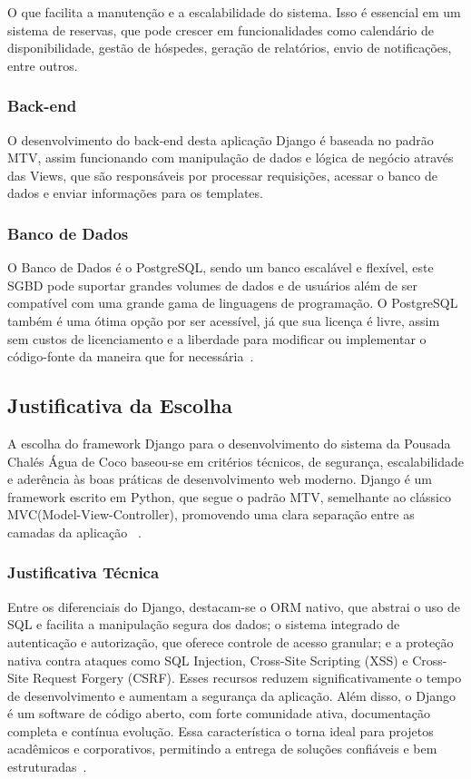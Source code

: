 \documentclass[
	12pt,				%
	openany,			%
	twoside,			%
	a4paper,			%
	english,			%
	french,				%
	spanish,			%
	brazil				%
	]{abntex2}
\begin{document}
O que facilita a manutenção e a escalabilidade do sistema. Isso é essencial em um sistema de reservas, que pode crescer em funcionalidades como calendário de disponibilidade, gestão de hóspedes, geração de relatórios, envio de notificações, entre outros.

\subsubsection{Back-end}

O desenvolvimento do back-end desta aplicação Django é baseada no padrão MTV, assim funcionando com manipulação de dados e lógica de negócio através das Views, que são responsáveis por processar requisições, acessar o banco de dados e enviar informações para os templates.

\subsubsection{Banco de Dados}

O Banco de Dados é o PostgreSQL, sendo um banco escalável e flexível, este SGBD pode suportar grandes volumes de dados e de usuários além de ser compatível com uma grande gama de linguagens de programação.
O PostgreSQL também é uma ótima opção por ser acessível, já que sua licença é livre, assim sem custos de licenciamento e a liberdade para modificar ou implementar o código-fonte da maneira que for necessária~\cite{postgresql}.

\subsection{Justificativa da Escolha}

A escolha do framework Django para o desenvolvimento do sistema da Pousada Chalés Água de Coco baseou-se em critérios técnicos, de segurança, escalabilidade e aderência às boas práticas de desenvolvimento web moderno. Django é um framework escrito em Python, que segue o padrão MTV, semelhante ao clássico MVC(Model-View-Controller), promovendo uma clara separação entre as camadas da aplicação ~\cite{python}.

\subsubsection{Justificativa Técnica}

Entre os diferenciais do Django, destacam-se o ORM nativo, que abstrai o uso de SQL e facilita a manipulação segura dos dados; o sistema integrado de autenticação e autorização, que oferece controle de acesso granular; e a proteção nativa contra ataques como SQL Injection, Cross-Site Scripting (XSS) e Cross-Site Request Forgery (CSRF). Esses recursos reduzem significativamente o tempo de desenvolvimento e aumentam a segurança da aplicação.
Além disso, o Django é um software de código aberto, com forte comunidade ativa, documentação completa e contínua evolução. Essa característica o torna ideal para projetos acadêmicos e corporativos, permitindo a entrega de soluções confiáveis e bem estruturadas~\cite{django}.
\end{document}
